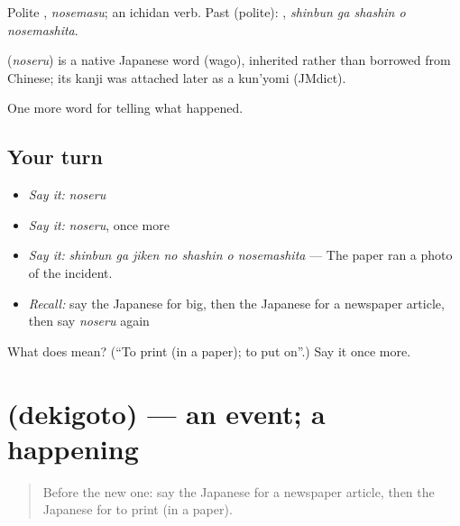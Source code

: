 Polite \textbf{}, \emph{nosemasu}; an ichidan verb. Past (polite): \textbf{  }, \emph{shinbun ga shashin o nosemashita}.

\begin{cousinweb}
\textbf{} (\emph{noseru}) is a native Japanese word (wago), inherited rather than borrowed from Chinese; its kanji was attached later as a kun'yomi (JMdict).
\end{cousinweb}

\begin{grammarlens}[title={What you've built}]
One more word for telling what happened.
\end{grammarlens}

\subsection*{Your turn}
\begin{itemize}
\raggedright
  \item \emph{Say it:} \emph{noseru}
  \item \emph{Say it:} \emph{noseru}, once more
  \item \emph{Say it:} \emph{shinbun ga jiken no shashin o nosemashita} — The paper ran a photo of the incident.
  \item \emph{Recall:} say the Japanese for big, then the Japanese for a newspaper article, then say \emph{noseru} again
\end{itemize}

\begin{tcolorbox}[breakable,colback=teal!4,colframe=teal!35!black,title={Before you move on}]
What does  mean? (\textquotedblleft{}To print (in a paper); to put on\textquotedblright{}.) Say it once more.
\end{tcolorbox}
\section[\texorpdfstring{\ja{できごと} (dekigoto)}{できごと (dekigoto)}]{ (dekigoto) — an event; a happening}

\label{lesson:JA-C280-dekigoto}



\begin{quote}
Before the new one: say the Japanese for a newspaper article, then the Japanese for to print (in a paper).
\end{quote}

